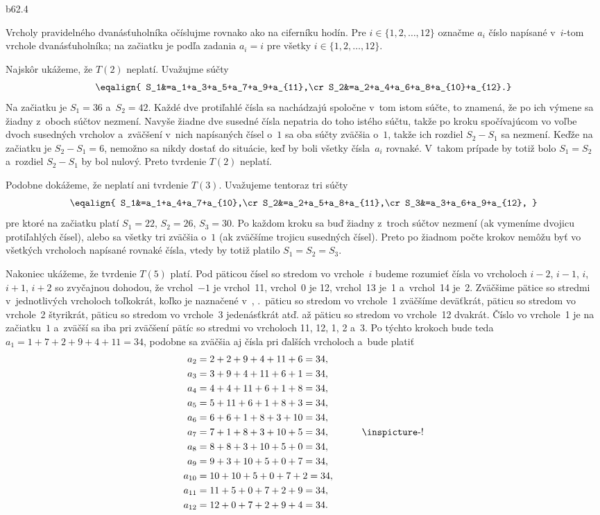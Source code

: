 {%
\mppic b62.4 \hfil\Obr \par
Vrcholy pravidelného dvanásťuholníka očíslujme rovnako ako na ciferníku
hodín. Pre $i\in\{1,2,\dots,12\}$ označme $a_i$ číslo napísané v~$i$-tom
vrchole dvanásťuholníka; na začiatku je podľa zadania $a_i=i$ pre všetky
$i\in\{1,2,\dots,12\}$.

Najskôr ukážeme, že $T(2)$ neplatí. Uvažujme súčty
$$
\eqalign{
  S_1&=a_1+a_3+a_5+a_7+a_9+a_{11},\cr
  S_2&=a_2+a_4+a_6+a_8+a_{10}+a_{12}.}
$$
Na začiatku je $S_1=36$ a~$S_2=42$. Každé dve protiľahlé čísla sa nachádzajú
spoločne v~tom istom súčte, to znamená, že po ich výmene
sa žiadny z~oboch súčtov nezmení. Navyše žiadne dve susedné čísla nepatria do
toho istého súčtu, takže po kroku spočívajúcom vo voľbe dvoch susedných
vrcholov a~zväčšení v~nich napísaných čísel o~$1$ sa oba súčty zväčšia o~$1$,
takže ich rozdiel $S_2-S_1$ sa nezmení. Keďže na začiatku je $S_2-S_1=6$,
nemožno sa nikdy dostať do situácie, keď by boli všetky čísla~$a_i$ rovnaké.
V~takom prípade by totiž bolo $S_1=S_2$ a~rozdiel
$S_2-S_1$ by bol nulový. Preto tvrdenie $T(2)$ neplatí.

Podobne dokážeme, že neplatí ani tvrdenie $T(3)$. Uvažujeme tentoraz tri súčty
$$
\eqalign{
S_1&=a_1+a_4+a_7+a_{10},\cr
S_2&=a_2+a_5+a_8+a_{11},\cr
S_3&=a_3+a_6+a_9+a_{12},
}
$$
pre ktoré na začiatku platí $S_1=22$, $S_2=26$, $S_3=30$. Po každom kroku sa
buď žiadny z~troch súčtov nezmení (ak vymeníme dvojicu protiľahlých čísel),
alebo sa všetky tri zväčšia o~$1$ (ak zväčšíme
trojicu susedných čísel). Preto po žiadnom počte krokov nemôžu byť
vo všetkých vrcholoch napísané rovnaké čísla, vtedy by totiž platilo $S_1=S_2=S_3$.

Nakoniec ukážeme, že tvrdenie $T(5)$ platí. Pod päticou čísel so stredom vo vrchole~$i$
budeme rozumieť čísla vo vrcholoch $i-2$, $i-1$, $i$, $i+1$, $i+2$
so zvyčajnou dohodou, že vrchol~${-1}$ je vrchol~11, vrchol~0 je 12, vrchol~13 je~1
a~vrchol~14 je~2. Zväčšime pätice so stredmi v~jednotlivých vrcholoch
toľkokrát, koľko je naznačené v~\obr, \tj.~päticu so stredom vo vrchole~1
zväčšíme deväťkrát, päticu so stredom vo vrchole~2 štyrikrát, päticu so
stredom vo vrchole~3 jedenásťkrát atď. až päticu so stredom vo vrchole~12
dvakrát. Číslo vo vrchole~1 je na začiatku~$1$ a~zväčší sa iba pri zväčšení
pätíc so stredmi vo vrcholoch 11, 12, 1, 2 a~3. Po týchto krokoch bude teda
$a_1=1+7+2+9+4+11=34$, podobne sa zväčšia aj čísla pri ďalších vrcholoch a~bude
platiť
$$
\aligned
 a_2&=2+2+9+4+11+6=34,\cr
 a_3&=3+9+4+11+6+1=34,\cr
 a_4&=4+4+11+6+1+8=34,\cr
 a_5&=5+11+6+1+8+3=34,\cr
 a_6&=6+6+1+8+3+10=34,\cr
 a_7&=7+1+8+3+10+5=34,\cr
 a_8&=8+8+3+10+5+0=34,\cr
 a_9&=9+3+10+5+0+7=34,\cr
 a_{10}&=10+10+5+0+7+2=34,\cr
 a_{11}&=11+5+0+7+2+9=34,\cr
 a_{12}&=12+0+7+2+9+4=34.
\endaligned
\qquad\vcenter{\hbox{\inspicture-!}}
$$

}
